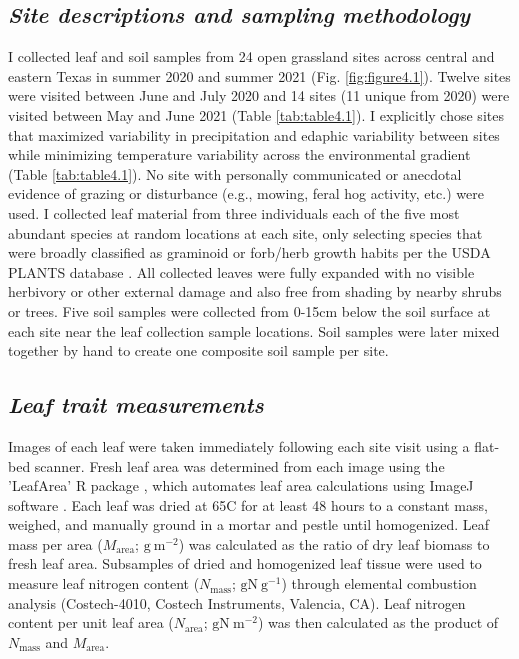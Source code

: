 \subsection{\textit{Site descriptions and sampling methodology}}
\noindent I collected leaf and soil samples from 24 open grassland sites across central and eastern Texas in summer 2020 and summer 2021 (Fig. \ref{fig:figure4.1}). Twelve sites were visited between June and July 2020 and 14 sites (11 unique from 2020) were visited between May and June 2021 (Table \ref{tab:table4.1}). I explicitly chose sites that maximized variability in precipitation and edaphic variability between sites while minimizing temperature variability across the environmental gradient (Table \ref{tab:table4.1}). No site with personally communicated or anecdotal evidence of grazing or disturbance (e.g., mowing, feral hog activity, etc.) were used. I collected leaf material from three individuals each of the five most abundant species at random locations at each site, only  selecting species that were broadly classified as graminoid or forb/herb growth habits per the USDA PLANTS database . All collected leaves were fully expanded with no visible herbivory or other external damage and also free from shading by nearby shrubs or trees. Five soil samples were collected from 0-15cm below the soil surface at each site near the leaf collection sample locations. Soil samples were later mixed together by hand to create one composite soil sample per site.

\subsection{\textit{Leaf trait measurements}}
\noindent Images of each leaf were taken immediately following each site visit using a flat-bed scanner. Fresh leaf area was determined from each image using the 'LeafArea' R package , which automates leaf area calculations using ImageJ software . Each leaf was dried at 65\textdegree{}C for at least 48 hours to a constant mass, weighed, and manually ground in a mortar and pestle until homogenized. Leaf mass per area ($M_\mathrm{area}$; $\mathrm{g\ m^{-2}}$) was calculated as the ratio of dry leaf biomass to fresh leaf area. Subsamples of dried and homogenized leaf tissue were used to measure leaf nitrogen content ($N_\mathrm{mass}$; $\mathrm{gN\ g^{-1}}$) through elemental combustion analysis (Costech-4010, Costech Instruments, Valencia, CA). Leaf nitrogen content per unit leaf area ($N_\mathrm{area}$; $\mathrm{gN\ m^{-2}}$) was then calculated as the product of $N_\mathrm{mass}$ and $M_\mathrm{area}$.
    
